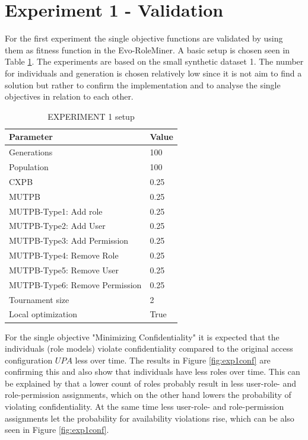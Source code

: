 \section{Experiment 1 - Validation}
\label{sec:phase1}
For the first experiment the single objective functions are validated by using them as fitness function in the Evo-RoleMiner. A basic setup is chosen seen in Table \ref{tab:setup1}. The experiments are based on the small synthetic dataset 1. The number for individuals and generation is chosen relatively low since it is not aim to find a solution but rather to confirm the implementation and to analyse the single objectives in relation to each other. \\
\begin{table}[H]
    \centering
    \begin{tabular}{|l|l|}
        \hline
        \rowcolor{gray!25} 
        \textbf{Parameter}              & \textbf{Value}    \\ \hline
        Generations                     & 100              \\ \hline
        Population                      & 100              \\ \hline
        CXPB                            & 0.25              \\ \hline
        MUTPB                           & 0.25              \\ \hline
        MUTPB-Type1: Add role           & 0.25              \\ \hline
        MUTPB-Type2: Add User           & 0.25              \\ \hline
        MUTPB-Type3: Add Permission     & 0.25              \\ \hline
        MUTPB-Type4: Remove Role        & 0.25              \\ \hline
        MUTPB-Type5: Remove User        & 0.25              \\ \hline
        MUTPB-Type6: Remove Permission  & 0.25              \\ \hline
        Tournament size                 & 2                 \\ \hline
        Local optimization              & True              \\ \hline
    \end{tabular}
    \caption{EXPERIMENT 1 setup}
    \label{tab:setup1}
\end{table}
For the single objective "Minimizing Confidentiality" it is expected that the individuals (role models) violate confidentiality compared to the original access configuration $UPA$ less over time. The results in Figure \ref{fig:exp1conf} are confirming this and also show that individuals have less roles over time. This can be explained by that a lower count of roles probably result in less user-role- and role-permission assignments, which on the other hand lowers the probability of violating confidentiality. At the same time less user-role- and role-permission assignments let the probability for availability violations rise, which can be also seen in Figure \ref{fig:exp1conf}.

